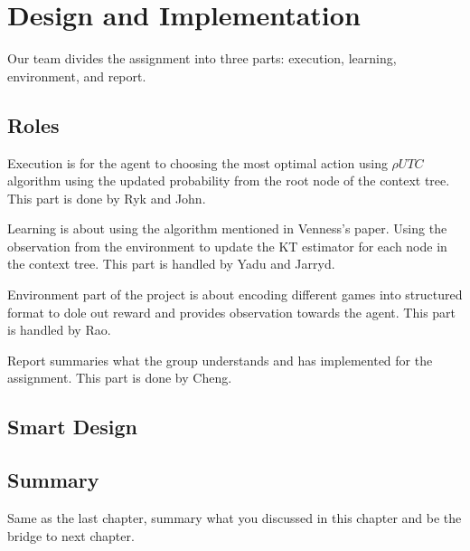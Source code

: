 \chapter{Design and Implementation}
\label{cha:design}
Our team divides the assignment into three parts: execution, learning, environment, and report. 

\section{Roles}
Execution is for the agent to choosing the most optimal action using $\rho UTC$ algorithm using the updated probability from the root node of the context tree. This part is done by Ryk and John.

Learning is about using the algorithm mentioned in Venness's paper. Using the observation from the environment to update the KT estimator for each node in the context tree. This part is handled by Yadu and Jarryd. 

Environment part of the project is about encoding different games into structured format to dole out reward and provides observation towards the agent. This part is handled by Rao.

Report summaries what the group understands and has implemented for the assignment. This part is done by Cheng.   

\section{Smart Design}
\label{sec:des-hotpath}



\section{Summary}
Same as the last chapter, summary what you discussed in this chapter and
be the bridge to next chapter.

